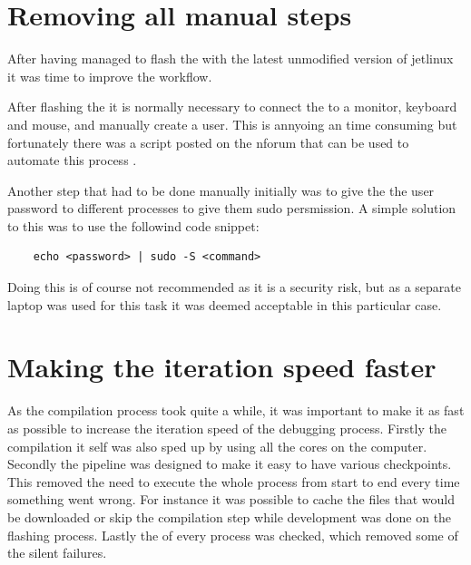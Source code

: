 \section{Removing all manual steps}
After having managed to flash the \jx with the latest unmodified version of \gls{jetlinux} it was time to improve the workflow.

After flashing the \jx it is normally necessary to connect the \jx to a monitor, keyboard and mouse, and manually create a user.
This is annyoing an time consuming but fortunately there was a script posted on the \gls{nforum} that can be used to automate this process \cite{waynewwwScriptBypassAccountJun2819}.

Another step that had to be done manually initially was to give the the user password to different processes to give them sudo persmission.
A simple solution to this was to use the followind code snippet:
\begin{verbatim}
    echo <password> | sudo -S <command>
\end{verbatim}
Doing this is of course not recommended as it is a security risk, but as a separate laptop was used for this task it was deemed acceptable in this particular case.

\section{Making the iteration speed faster}
As the compilation process took quite a while, it was important to make it as fast as possible to increase the iteration speed of the debugging process.
Firstly the compilation it self was also sped up by using all the cores on the computer.
Secondly the pipeline was designed to make it easy to have various checkpoints.
This removed the need to execute the whole process from start to end every time something went wrong.
For instance it was possible to cache the files that would be downloaded or skip the compilation step while development was done on the flashing process.
Lastly the  of every process was checked, which removed some of the silent failures.

